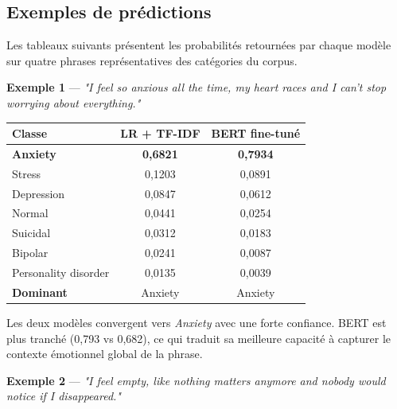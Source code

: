 \documentclass[12pt,a4paper]{report}
\begin{document}
\subsection{Exemples de prédictions}

Les tableaux suivants présentent les probabilités retournées par chaque modèle sur
quatre phrases représentatives des catégories du corpus.

\bigskip

\textbf{Exemple 1} — \textit{"I feel so anxious all the time, my heart races and I can't
stop worrying about everything."}

\begin{center}
\begin{tabular}{@{}lcc@{}}
\toprule
\textbf{Classe} & \textbf{LR + TF-IDF} & \textbf{BERT fine-tuné} \\
\midrule
\textbf{Anxiety}       & \textbf{0,6821} & \textbf{0,7934} \\
Stress                 & 0,1203          & 0,0891 \\
Depression             & 0,0847          & 0,0612 \\
Normal                 & 0,0441          & 0,0254 \\
Suicidal               & 0,0312          & 0,0183 \\
Bipolar                & 0,0241          & 0,0087 \\
Personality disorder   & 0,0135          & 0,0039 \\
\midrule
\textbf{Dominant} & Anxiety & Anxiety \\
\bottomrule
\end{tabular}
\end{center}

\begin{note}[Interprétation]
Les deux modèles convergent vers \textit{Anxiety} avec une forte confiance. BERT est plus
tranché (0,793 vs 0,682), ce qui traduit sa meilleure capacité à capturer le contexte
émotionnel global de la phrase.
\end{note}

\pagebreak

\textbf{Exemple 2} — \textit{"I feel empty, like nothing matters anymore and nobody would
notice if I disappeared."}
\end{document}
